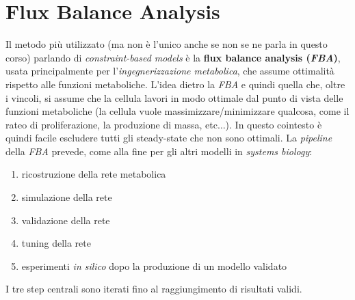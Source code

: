 \documentclass[a4paper,12pt, oneside]{book}
\begin{document}
\section{Flux Balance Analysis}
Il metodo più utilizzato (ma non è l'unico anche se non se ne parla in questo
corso) parlando di \textit{constraint-based models} è la 
\textbf{flux balance analysis (\textit{FBA})}, usata principalmente per
l'\textit{ingegnerizzazione metabolica}, che assume ottimalità rispetto
alle funzioni metaboliche. L'idea dietro la \textit{FBA} e quindi quella che,
oltre i vincoli, si assume che la cellula lavori in modo ottimale dal punto di
vista delle funzioni metaboliche (la cellula vuole massimizzare/minimizzare
qualcosa, come il rateo di proliferazione, la produzione di massa,
etc$\ldots$). In questo cointesto è quindi facile escludere tutti gli 
steady-state che non sono ottimali. La \textit{pipeline} della \textit{FBA}
prevede, come alla fine per gli altri modelli in \textit{systems biology}: 
\begin{enumerate}
  \item ricostruzione della rete metabolica
  \item simulazione della rete
  \item validazione della rete
  \item tuning della rete
  \item esperimenti \textit{in silico} dopo la produzione di un modello validato
\end{enumerate}
I tre step centrali sono iterati fino al raggiungimento di risultati validi.
\end{document}
